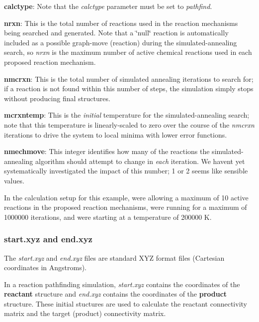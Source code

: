 \begin{DoxyItemize}
\item {\bfseries calctype}\+: Note that the {\itshape calctype} parameter must be set to {\itshape pathfind}.
\item {\bfseries nrxn}\+: This is the total number of reactions used in the reaction mechanisms being searched and generated. Note that a \char`\"{}null\char`\"{} reaction is automatically included as a possible graph-\/move (reaction) during the simulated-\/annealing search, so {\itshape nrxn} is the maximum number of active chemical reactions used in each proposed reaction mechanism.
\item {\bfseries nmcrxn}\+: This is the total number of simulated annealing iterations to search for; if a reaction is not found within this number of steps, the simulation simply stops without producing final structures.
\item {\bfseries mcrxntemp}\+: This is the {\itshape initial} temperature for the simulated-\/annealing search; note that this temperature is linearly-\/scaled to zero over the course of the {\itshape nmcrxn} iterations to drive the system to local minima with lower error functions.
\item {\bfseries nmechmove}\+: This integer identifies how many of the reactions the simulated-\/annealing algorithm should attempt to change in {\itshape each} iteration. We haven\textquotesingle{}t yet systematically investigated the impact of this number; 1 or 2 seems like sensible values.
\end{DoxyItemize}

In the calculation setup for this example, we\textquotesingle{}re allowing a maximum of 10 active reactions in the proposed reaction mechanisms, we\textquotesingle{}re running for a maximum of 1000000 iterations, and we\textquotesingle{}re starting at a temperature of 200000 K.

\subsubsection*{start.\+xyz and end.\+xyz}

The {\itshape start.\+xyz} and {\itshape end.\+xyz} files are standard X\+YZ format files (Cartesian coordinates in Angstroms).

In a reaction pathfinding simulation, {\itshape start.\+xyz} contains the coordinates of the {\bfseries reactant} structure and {\itshape end.\+xyz} contains the coordinates of the {\bfseries product} structure. These initial stuctures are used to calculate the reactant connectivity matrix and the target (product) connectivity matrix.

